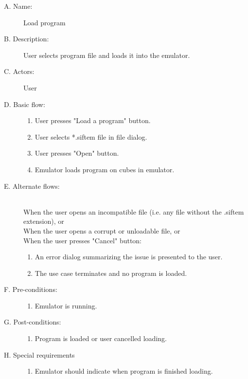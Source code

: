 \documentclass[12pt]{article}
\begin{document}
    \begin{description}
      \item[A. Name:] Load program
      \item[B. Description:] User selects program file and loads it into the emulator.
      \item[C. Actors:] User
      \item[D. Basic flow:] \hfill 
        \begin{enumerate}
	  \item{User presses "Load a program" button.}
	  \item{User selects *.siftem file in file dialog.}
	  \item{User presses "Open" button.}
	  \item{Emulator loads program on cubes in emulator.}
        \end{enumerate}
      \item[E. Alternate flows:] \hfill \\
	When the user opens an incompatible file (i.e. any file without the .siftem extension), or \\
	When the user opens a corrupt or unloadable file, or \\
	When the user presses "Cancel" button:
        \begin{enumerate}
	  \item{An error dialog summarizing the issue is presented to the user.}
	  \item{The use case terminates and no program is loaded.}
        \end{enumerate}
      \item[F. Pre-conditions:] \hfill
        \begin{enumerate}
          \item{Emulator is running.}
        \end{enumerate}
      \item[G. Post-conditions:] \hfill
        \begin{enumerate}
	  \item{Program is loaded or user cancelled loading.}
        \end{enumerate}
      \item[H. Special requirements] \hfill
        \begin{enumerate}
          \item{Emulator should indicate when program is finished loading.}
        \end{enumerate}
    \end{description}
\end{document}
